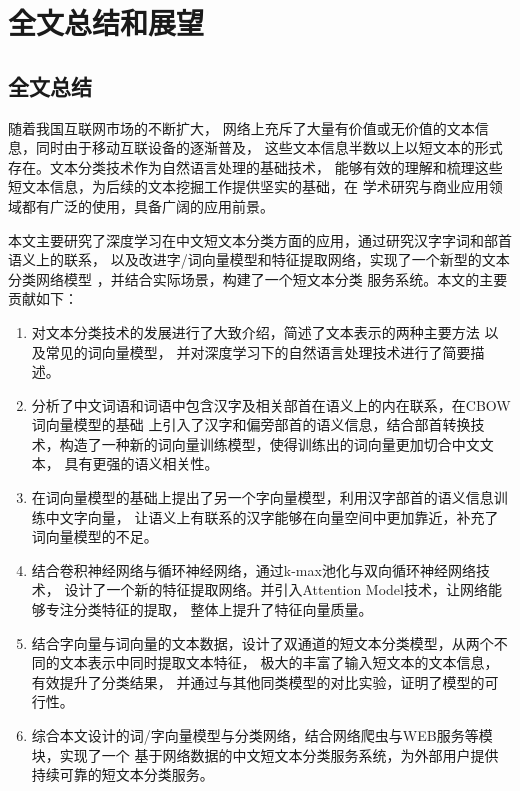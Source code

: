 \documentclass{standalone}
\begin{document}
\chapter{全文总结和展望}
\section{全文总结}
随着我国互联网市场的不断扩大，
网络上充斥了大量有价值或无价值的文本信息，同时由于移动互联设备的逐渐普及，
这些文本信息半数以上以短文本的形式存在。文本分类技术作为自然语言处理的基础技术，
能够有效的理解和梳理这些短文本信息，为后续的文本挖掘工作提供坚实的基础，在
学术研究与商业应用领域都有广泛的使用，具备广阔的应用前景。

本文主要研究了深度学习在中文短文本分类方面的应用，通过研究汉字字词和部首语义上的联系，
以及改进字/词向量模型和特征提取网络，实现了一个新型的文本分类网络模型
，并结合实际场景，构建了一个短文本分类
服务系统。本文的主要贡献如下：
\begin{enumerate}
    \item 对文本分类技术的发展进行了大致介绍，简述了文本表示的两种主要方法
    以及常见的词向量模型，
    并对深度学习下的自然语言处理技术进行了简要描述。
    \item 分析了中文词语和词语中包含汉字及相关部首在语义上的内在联系，在CBOW词向量模型的基础
    上引入了汉字和偏旁部首的语义信息，结合部首转换技术，构造了一种新的词向量训练模型，使得训练出的词向量更加切合中文文本，
    具有更强的语义相关性。
    \item 在词向量模型的基础上提出了另一个字向量模型，利用汉字部首的语义信息训练中文字向量，
    让语义上有联系的汉字能够在向量空间中更加靠近，补充了词向量模型的不足。
    \item 结合卷积神经网络与循环神经网络，通过k-max池化与双向循环神经网络技术，
    设计了一个新的特征提取网络。并引入Attention Model技术，让网络能够专注分类特征的提取，
    整体上提升了特征向量质量。
    \item 结合字向量与词向量的文本数据，设计了双通道的短文本分类模型，从两个不同的文本表示中同时提取文本特征，
    极大的丰富了输入短文本的文本信息，有效提升了分类结果，
    并通过与其他同类模型的对比实验，证明了模型的可行性。
    \item 综合本文设计的词/字向量模型与分类网络，结合网络爬虫与WEB服务等模块，实现了一个
    基于网络数据的中文短文本分类服务系统，为外部用户提供持续可靠的短文本分类服务。
\end{enumerate}
\end{document}
